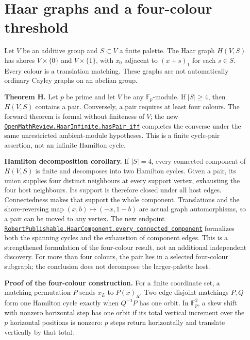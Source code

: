 \documentclass[smallextended]{svjour3}
\begin{document}
\section{Haar graphs and a four-colour
threshold}\label{haar-graphs-and-a-four-colour-threshold}

Let \(V\) be an additive group and \(S\subset V\) a finite palette. The
Haar graph \(H(V,S)\) has shores \(V\times\{0\}\) and \(V\times\{1\}\),
with \(x_0\) adjacent to \((x+s)_1\) for each \(s\in S\). Every colour
is a translation matching. These graphs are not automatically ordinary
Cayley graphs on an abelian group.

\textbf{Theorem H.} Let \(p\) be prime and let \(V\) be any
\(\mathbb F_p\)-module. If \(|S|\geq4\), then \(H(V,S)\) contains a
pair. Conversely, a pair requires at least four colours. The forward
theorem is formal without finiteness of \(V\); the new
\href{https://github.com/alejandrozu/openmath-2026-judging/blob/70c5ec3107658182f22c207d4c50f53f9cb3e602/robert-review-2026-10-07/lean/HaarInfinite.lean\#L110}{\texttt{OpenMathReview.HaarInfinite.hasPair\_iff}}
completes the converse under the same unrestricted ambient-module
hypotheses. This is a finite cycle-pair assertion, not an infinite
Hamilton cycle.

\textbf{Hamilton decomposition corollary.} If \(|S|=4\), every connected
component of \(H(V,S)\) is finite and decomposes into two Hamilton
cycles. Given a pair, its union supplies four distinct neighbours at
every support vertex, exhausting the four host neighbours. Its support
is therefore closed under all host edges. Connectedness makes that
support the whole component. Translations and the shore-reversing map
\((x,b)\mapsto(-x,1-b)\) are actual graph automorphisms, so a pair can
be moved to any vertex. The new endpoint
\href{https://github.com/alejandrozu/openmath-2026-judging/blob/70c5ec3107658182f22c207d4c50f53f9cb3e602/robert-review-2026-10-07/lean/HaarComponents.lean\#L73}{\texttt{RobertPublishable.HaarComponent.every\_connected\_component}}
formalizes both the spanning cycles and the exhaustion of component
edges. This is a strengthened formulation of the four-colour result, not
an additional independent discovery. For more than four colours, the
pair lies in a selected four-colour subgraph; the conclusion does not
decompose the larger-palette host.

\textbf{Proof of the four-colour construction.} For a finite coordinate
set, a matching permutation \(P\) sends \(x_L\) to \(P(x)_R\). Two
edge-disjoint matchings \(P,Q\) form one Hamilton cycle exactly when
\(Q^{-1}P\) has one orbit. In \(\mathbb F_p^2\), a skew shift with
nonzero horizontal step has one orbit if its total vertical increment
over the \(p\) horizontal positions is nonzero: \(p\) steps return
horizontally and translate vertically by that total.
\end{document}
